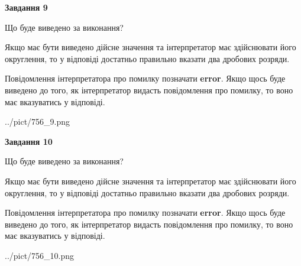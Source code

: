 \documentclass[12pt, ukrainian]{article}
\begin{document}
{\begin {Large}
{\begin {center}\textbf{Завдання 9}\end {center}}\par
Що буде виведено за виконання? \par

Якщо має бути виведено дійсне значення та інтерпретатор має здійснювати його округлення, 
то у відповіді достатньо правильно вказати два дробових розряди.

Повідомлення інтерпретатора про помилку позначати \textbf{error}.
Якщо щось буде виведено до того, як інтерпретатор видасть повідомлення про помилку, 
то воно має вказуватись у відповіді. \par

\begin{center}
	{../pict/756_9.png}
\end{center}
\newpage

{\begin {center}\textbf{Завдання 10}\end {center}}\par
Що буде виведено за виконання? \par

Якщо має бути виведено дійсне значення та інтерпретатор має здійснювати його округлення, 
то у відповіді достатньо правильно вказати два дробових розряди.

Повідомлення інтерпретатора про помилку позначати \textbf{error}.
Якщо щось буде виведено до того, як інтерпретатор видасть повідомлення про помилку, 
то воно має вказуватись у відповіді. \par

\begin{center}
	{../pict/756_10.png}
\end{center}
\newpage

\end {Large}}
\end{document}
